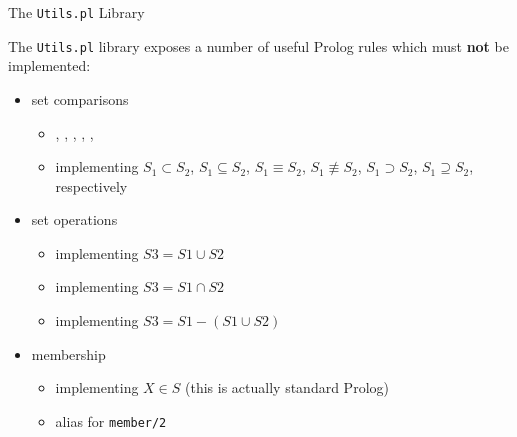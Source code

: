 \documentclass[presentation]{beamer}\mode<presentation>{\usetheme{AMSBolognaFC}}
\begin{document}
\begin{frame}[c]{The \texttt{Utils.pl} Library}

	The \texttt{Utils.pl} library exposes a number of useful Prolog rules which must \textbf{not} be implemented:
	\vfill
	\begin{itemize}
		\item set comparisons %
		\begin{itemize}
			\item {}, , , , , 
			\item implementing $S_1 \subset S_2$, $S_1 \subseteq S_2$, $S_1 \equiv S_2$, $S_1 \not\equiv S_2$, $S_1 \supset S_2$, $S_1 \supseteq S_2$, respectively
		\end{itemize}

		\vfill

		\item set operations
		\begin{itemize}
			\item {} implementing $S3 = S1 \cup S2$
			\item {} implementing $S3 = S1 \cap S2$
			\item {} implementing $S3 = S1 - (S1 \cup S2)$
		\end{itemize}

		\vfill

		\item membership
		\begin{itemize}
			\item {} implementing $X \in S$ \hfill {\small (this is actually standard Prolog)}
			\item {} alias for \texttt{member/2}
		\end{itemize}
	\end{itemize}
\end{frame}
\end{document}

